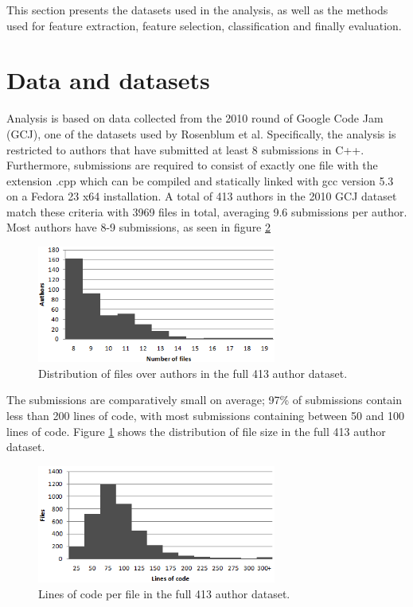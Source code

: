 \documentclass[a4paper,11pt]{kth-mag}
\begin{document}
This section presents the datasets used in the analysis, as well as the methods
used for feature extraction, feature selection, classification and finally
evaluation.

\section{Data and datasets} \label{sec:data-datasets}
Analysis is based on data collected from the 2010 round of Google Code Jam
(GCJ), one of the datasets used by Rosenblum et al. Specifically, the analysis
is restricted to authors that have submitted at least 8 submissions in C++.
Furthermore, submissions are required to consist of exactly one file with the
extension .cpp which can be compiled and statically linked with gcc version 5.3
on a Fedora 23 x64 installation. A total of 413 authors in the 2010 GCJ dataset
match these criteria with 3969 files in total, averaging 9.6 submissions per
author. Most authors have 8-9 submissions, as seen in figure \ref{fig:files} 

\begin{figure}[!htb]
    \centering
    \includegraphics[width=0.7\textwidth]{loc}
    \caption{Distribution of files over authors in the full 413 author
    dataset.}
    \label{fig:loc}
\end{figure}

The submissions are comparatively small on average; 97\% of submissions contain
less than 200 lines of code, with most submissions containing between 50 and
100 lines of code. Figure \ref{fig:loc} shows the distribution of file size
in the full 413 author dataset. 

\begin{figure}[!htb]
    \centering
    \includegraphics[width=0.7\textwidth]{files}
    \caption{Lines of code per file in the full 413 author dataset.}
    \label{fig:files}
\end{figure}
\end{document}
